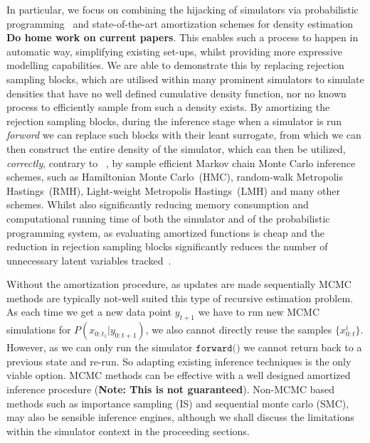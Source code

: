 \documentclass{article}
\begin{document}
% 
In particular, we focus on combining the hijacking of simulators via probabilistic programming~\cite{baydin2018efficient} and 
state-of-the-art amortization schemes for density estimation \textbf{ Do home work on current papers}.
This enables such a process to happen in automatic way, simplifying existing set-ups, whilst providing
more expressive modelling capabilities. 
We are able to demonstrate this by replacing rejection sampling blocks, which are utilised within 
many prominent simulators to simulate densities that have no well defined cumulative density 
function, nor no known process to efficiently sample from such a density exists. 
By amortizing the rejection sampling blocks, during the inference stage when a simulator is run \emph{forword} we 
can replace such blocks with their leant surrogate, from which we can then construct the entire 
density of the simulator, which can then be utilized, \emph{correctly}, contrary to ~\cite{baydin2018efficient},
by sample efficient Markov chain Monte Carlo inference schemes, such as Hamiltonian Monte Carlo~(HMC),
random-walk Metropolis Hastings~(RMH), Light-weight Metropolis Hastings~(LMH) and many other schemes.
Whilst also significantly reducing memory consumption and computational running time of 
both the simulator and of the probabilistic programming system, as evaluating amortized functions 
is cheap and the reduction in rejection sampling blocks significantly reduces the number of 
unnecessary latent variables tracked~\cite{baydin2018efficient}.  

Without the amortization procedure, as updates are made sequentially MCMC methods are typically not-well suited this type of recursive
estimation problem. 
As each time we get a new data point $y_{t+1}$ we have to run new MCMC simulations 
for $P(x_{0:t_1}| y_{0:t+1})$, we also cannot directly reuse the samples $\{x^{i}_{0:t}\}$. 
However, as we can only run the simulator $\texttt{forward()}$ we cannot return back to a previous state and re-run. 
So adapting existing inference techniques is the only viable option. 
MCMC methods can be effective with a well designed amortized inference procedure (\textbf{Note: This is not guaranteed}).
Non-MCMC based methods such as importance sampling (IS) and sequential monte carlo (SMC), may also be
sensible inference engines, although we shall discuss the limitations within the simulator context in the proceeding sections.  
\end{document}
